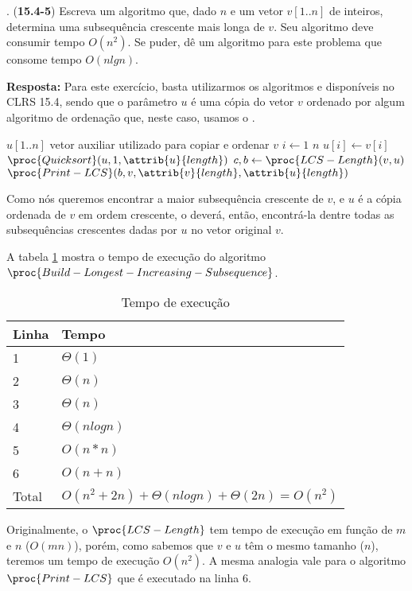 
. (\textbf{15.4-5})  Escreva um algoritmo que, dado $n$ e um vetor $v[1..n]$ de inteiros, determina uma subsequência crescente mais longa de $v$. Seu algoritmo deve consumir tempo $O(n^2)$. Se puder, dê um algoritmo para este problema que consome tempo $O(n lg n)$.

\textbf{Resposta:} Para este exercício, basta utilizarmos os algoritmos  e  disponíveis no CLRS 15.4, sendo que o parâmetro $u$ é uma cópia do vetor $v$ ordenado por algum algoritmo de ordenação que, neste caso, usamos o .

\begin{codebox}
\li $u[1..n]$ vetor auxiliar utilizado para copiar e ordenar $v$
\li \For $i \gets 1$ \To $n$
\li \Do
        $u[i] \gets v[i]$
    \End
\li $\proc{Quicksort}(u, 1, \attrib{u}{length})$
\li	$c, b \gets \proc{LCS-Length}(v, u)$
\li	$\proc{Print-LCS}(b, v, \attrib{v}{length}, \attrib{u}{length})$
\end{codebox}

Como nós queremos encontrar a maior subsequência crescente de $v$, e $u$ é a cópia ordenada de $v$ em ordem crescente, o  deverá, então, encontrá-la dentre todas as subsequências crescentes dadas por $u$ no vetor original $v$.

A tabela \ref{tbl:6-4-1} mostra o tempo de execução do algoritmo $\proc{Build-Longest-Increasing-Subsequence}$.

\begin{table}[H]
\centering
\begin{tabular}{|l|l|}
\hline
Linha                   & Tempo \\ \hline
1 & $\Theta(1)$ \\ \hline
2 & $\Theta(n)$ \\ \hline
3 & $\Theta(n)$ \\ \hline
4 & $\Theta(n log n)$ \\ \hline
5 & $O(n * n)$ \\ \hline
6 & $O(n + n)$ \\ \hline
Total & $O(n^2 + 2n) + \Theta(n log n) + \Theta(2n) = O(n^2)$ \\ \hline
\end{tabular}
\caption{Tempo de execução}
\label{tbl:6-4-1}
\end{table}

Originalmente, o $\proc{LCS-Length}$ tem tempo de execução em função de $m$ e $n$ ($O(mn)$), porém, como sabemos que $v$ e $u$ têm o mesmo tamanho ($n$), teremos um tempo de execução $O(n^2)$. A mesma analogia vale para o algoritmo $\proc{Print-LCS}$ que é executado na linha 6.\\[12pt]